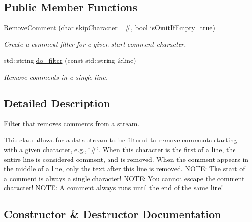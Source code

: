 \subsection*{Public Member Functions}
\begin{DoxyCompactItemize}
\item 
\hyperlink{classtudat_1_1input__output_1_1stream__filters_1_1RemoveComment_a042570e5ad70e639cae57ab805144c05}{Remove\+Comment} (char skip\+Character= \textquotesingle{}\#\textquotesingle{}, bool is\+Omit\+If\+Empty=true)
\begin{DoxyCompactList}\small\item\em Create a comment filter for a given start comment character. \end{DoxyCompactList}\item 
std\+::string \hyperlink{classtudat_1_1input__output_1_1stream__filters_1_1RemoveComment_aec88aaed0afacd0ea960d07b39597a9d}{do\+\_\+filter} (const std\+::string \&line)
\begin{DoxyCompactList}\small\item\em Remove comments in a single line. \end{DoxyCompactList}\end{DoxyCompactItemize}


\subsection{Detailed Description}
Filter that removes comments from a stream. 

This class allows for a data stream to be filtered to remove comments starting with a given character, e.\+g., \char`\"{}\#\char`\"{}. When this character is the first of a line, the entire line is considered comment, and is removed. When the comment appears in the middle of a line, only the text after this line is removed. N\+O\+TE\+: The start of a comment is always a single character! N\+O\+TE\+: You cannot escape the comment character! N\+O\+TE\+: A comment always runs until the end of the same line! 

\subsection{Constructor \& Destructor Documentation}
